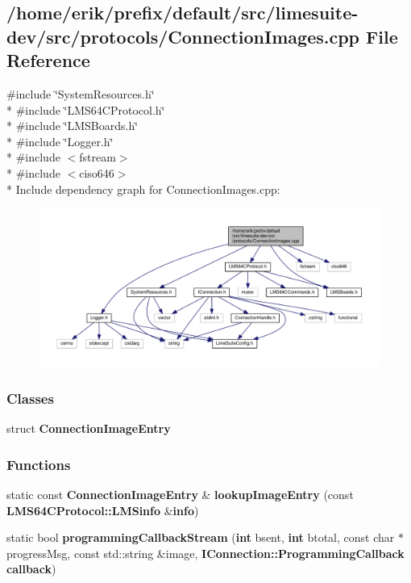 \subsection{/home/erik/prefix/default/src/limesuite-\/dev/src/protocols/\+Connection\+Images.cpp File Reference}
\label{ConnectionImages_8cpp}
{\ttfamily \#include \char`\"{}System\+Resources.\+h\char`\"{}}\\*
{\ttfamily \#include \char`\"{}L\+M\+S64\+C\+Protocol.\+h\char`\"{}}\\*
{\ttfamily \#include \char`\"{}L\+M\+S\+Boards.\+h\char`\"{}}\\*
{\ttfamily \#include \char`\"{}Logger.\+h\char`\"{}}\\*
{\ttfamily \#include $<$fstream$>$}\\*
{\ttfamily \#include $<$ciso646$>$}\\*
Include dependency graph for Connection\+Images.\+cpp\+:
\nopagebreak
\begin{figure}[H]
\begin{center}
\leavevmode
\includegraphics[width=350pt]{d6/d0b/ConnectionImages_8cpp__incl}
\end{center}
\end{figure}
\subsubsection*{Classes}
\begin{DoxyCompactItemize}
\item 
struct {\bf Connection\+Image\+Entry}
\end{DoxyCompactItemize}
\subsubsection*{Functions}
\begin{DoxyCompactItemize}
\item 
static const {\bf Connection\+Image\+Entry} \& {\bf lookup\+Image\+Entry} (const {\bf L\+M\+S64\+C\+Protocol\+::\+L\+M\+Sinfo} \&{\bf info})
\item 
static bool {\bf programming\+Callback\+Stream} ({\bf int} bsent, {\bf int} btotal, const char $\ast$progress\+Msg, const std\+::string \&image, {\bf I\+Connection\+::\+Programming\+Callback} {\bf callback})
\end{DoxyCompactItemize}



